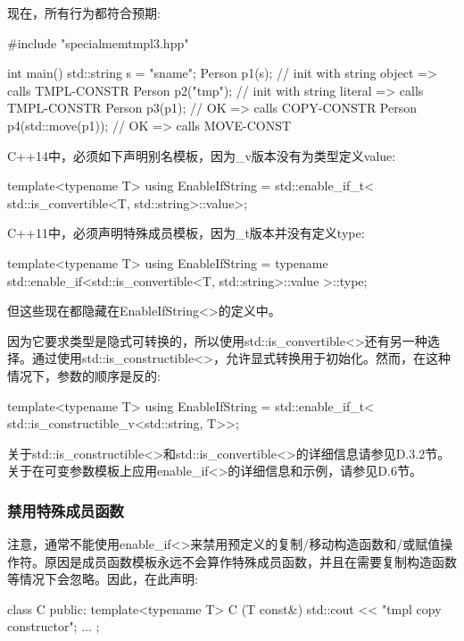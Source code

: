 现在，所有行为都符合预期:

\begin{cpp}
#include "specialmemtmpl3.hpp"

int main()
{
	std::string s = "sname";
	Person p1(s); // init with string object => calls TMPL-CONSTR
	Person p2("tmp"); // init with string literal => calls TMPL-CONSTR
	Person p3(p1); // OK => calls COPY-CONSTR
	Person p4(std::move(p1)); // OK => calls MOVE-CONST
}
\end{cpp}

C++14中，必须如下声明别名模板，因为\_v版本没有为类型定义value:

\begin{cpp}
template<typename T>
using EnableIfString = std::enable_if_t<
						std::is_convertible<T, std::string>::value>;
\end{cpp}

C++11中，必须声明特殊成员模板，因为\_t版本并没有定义type:

\begin{cpp}
template<typename T>
using EnableIfString
= typename std::enable_if<std::is_convertible<T, std::string>::value
						>::type;
\end{cpp}

但这些现在都隐藏在EnableIfString<>的定义中。

因为它要求类型是隐式可转换的，所以使用std::is\_convertible<>还有另一种选择。通过使用std::is\_constructible<>，允许显式转换用于初始化。然而，在这种情况下，参数的顺序是反的:

\begin{cpp}
template<typename T>
using EnableIfString = std::enable_if_t<
						std::is_constructible_v<std::string, T>>;
\end{cpp}

关于std::is\_constructible<>和std::is\_convertible<>的详细信息请参见D.3.2节。关于在可变参数模板上应用enable\_if<>的详细信息和示例，请参见D.6节。

\subsubsection{禁用特殊成员函数}

注意，通常不能使用enable\_if<>来禁用预定义的复制/移动构造函数和/或赋值操作符。原因是成员函数模板永远不会算作特殊成员函数，并且在需要复制构造函数等情况下会忽略。因此，在此声明:

\begin{cpp}
class C {
public:
	template<typename T>
	C (T const&) {
		std::cout << "tmpl copy constructor\n";
	}
	...
};
\end{cpp}


